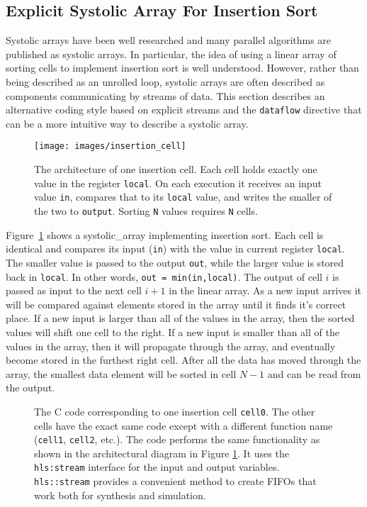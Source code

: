 \subsection{Explicit Systolic Array For Insertion Sort}
\label{sec:insertion_cells}
Systolic arrays have been well researched and many parallel algorithms are published as systolic arrays.  In particular, the idea of using a linear array of sorting cells to implement insertion sort is well understood\cite{ortiz2011streaming, bednara2000tradeoff, marcelino2008sorting, arcas2014empirical}. However, rather than being described as an unrolled loop, systolic arrays are often described as components communicating by streams of data. This section describes an alternative coding style based on explicit streams and the \lstinline{dataflow} directive that can be a more intuitive way to describe a systolic array.
  
\begin{figure}
\centering
\texttt{[image: images/insertion\_cell]}
\caption{ The architecture of one insertion cell. Each cell holds exactly one value in the register \lstinline{local}. On each execution it receives an input value \lstinline{in}, compares that to its \lstinline{local} value, and writes the smaller of the two to \lstinline{output}. Sorting \lstinline{N} values requires \lstinline{N} cells. }
\label{fig:insertion_cell}
\end{figure}

Figure~\ref{fig:insertion_cell} shows a \gls{systolic_array} implementing insertion sort. Each cell is identical and compares its input (\lstinline{in}) with the value in current register \lstinline{local}. The smaller value is passed to the output \lstinline{out}, while the larger value is stored back in \lstinline{local}. In other words, \lstinline{out = min(in,local)}.  The output of cell $i$ is passed as input to the next cell $i+1$ in the linear array. As a new input arrives it will be compared against elements stored in the array until it finds it's correct place.  If a new input is larger than all of the  values in the array, then the sorted values will shift one cell to the right.  If a new input is smaller than all of the values in the array, then it will propagate through the array, and eventually become stored in the furthest right cell. After all the data has moved through the array, the smallest data element will be sorted in cell $N-1$ and can be read from the output. 

\begin{figure}

\caption{  The \VHLS C code corresponding to one insertion cell \lstinline{cell0}. The other cells have the exact same code except with a different function name (\lstinline{cell1}, \lstinline{cell2}, etc.). The code performs the same functionality as shown in the architectural diagram in Figure \ref{fig:insertion_cell}. It uses the \lstinline{hls:stream} interface for the input and output variables. \lstinline{hls::stream} provides a convenient method to create FIFOs that work both for synthesis and simulation. }
\label{fig:insertion_cell_sort.cpp}
\end{figure}

